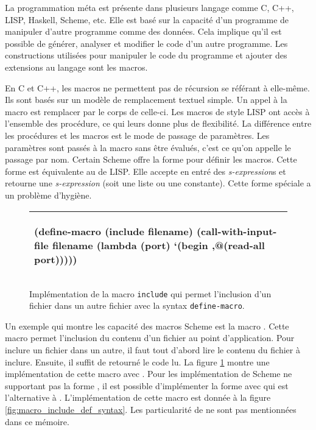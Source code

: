 La programmation méta est présente dans plusieurs langage comme C, C++, LISP,
Haskell, Scheme, etc. Elle est basé sur la capacité d'un programme de manipuler
d'autre programme comme des données. Cela implique qu'il est possible de
générer, analyser et modifier le code d'un autre programme.  Les
constructions utilisées pour manipuler le code du programme et
ajouter des extensions au langage sont les macros.

En C et C++, les macros ne permettent pas de récursion se référant à elle-même.
Ils sont basés sur un modèle de remplacement textuel simple. Un appel à la
macro est remplacer par le corps de celle-ci. Les macros de style LISP ont
accès à l'ensemble des procédure, ce qui leurs donne plus de flexibilité.  La
différence entre les procédures et les macros est le mode de passage de
paramètres.  Les paramètres sont passés à la macro sans être évalués, c'est ce
qu'on appelle le passage par nom.  Certain Scheme offre la forme
 pour définir les macros.  Cette forme est équivalente au
 de LISP. Elle accepte en entré des \textit{s-expression}s et
retourne une \textit{s-expression} (soit une liste ou une constante).  Cette
forme spéciale a un problème d'hygiène.

\begin{figure}[htbp]
  \begin{tabular}{|l|}\hline
\begin{mplisting}{0.7}
(define-macro (include filename)
  (call-with-input-file
    filename
    (lambda (port)
      `(begin
        ,@(read-all port)))))
\end{mplisting}\\\hline
\end{tabular}

  \caption{Implémentation de la macro \texttt{include} qui permet l'inclusion
  d'un fichier dans un autre fichier avec la syntax \texttt{define-macro}.}

  \label{fig:macro_include}
\end{figure}

Un exemple qui montre les capacité des macros Scheme est la macro
.  Cette macro permet l'inclusion du contenu d'un fichier au
point d'application.  Pour inclure un fichier dans un autre, il faut tout
d'abord lire le contenu du fichier à inclure. Ensuite, il suffit de retourné le
code lu. La figure \ref{fig:macro_include} montre une implémentation de cette
macro avec .  Pour les implémentation de Scheme ne
supportant pas la forme , il est possible d'implémenter
la forme  avec  qui est l'alternative à
. L'implémentation de cette macro est donnée à la figure
\ref{fig:macro_include_def_syntax}. Les particularité de
 ne sont pas mentionnées dans ce mémoire.

